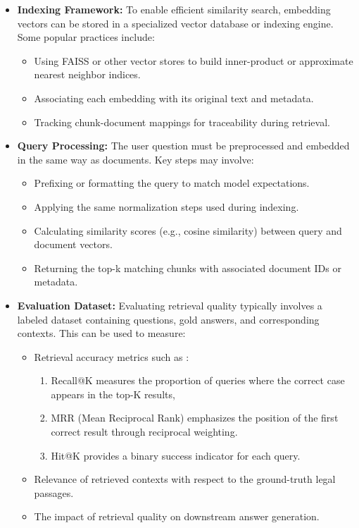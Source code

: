 \begin{itemize}
	\item \textbf{Indexing Framework:}
	To enable efficient similarity search, embedding vectors can be stored in a specialized vector database or indexing engine. Some popular practices include:
	\begin{itemize}
		\item Using FAISS or other vector stores to build inner-product or approximate nearest neighbor indices.
		\item Associating each embedding with its original text and metadata.
		\item Tracking chunk-document mappings for traceability during retrieval.
	\end{itemize}
	
	\item \textbf{Query Processing:}
	The user question must be preprocessed and embedded in the same way as documents. Key steps may involve:
	\begin{itemize}
		\item Prefixing or formatting the query to match model expectations.
		\item Applying the same normalization steps used during indexing.
		\item Calculating similarity scores (e.g., cosine similarity) between query and document vectors.
		\item Returning the top-k matching chunks with associated document IDs or metadata.
	\end{itemize}
	
	\item \textbf{Evaluation Dataset:}
	Evaluating retrieval quality typically involves a labeled dataset containing questions, gold answers, and corresponding contexts. This can be used to measure:
	\begin{itemize}
		\item Retrieval accuracy metrics such as :
		\begin{enumerate}
			\item  Recall@K measures the proportion of queries where the correct case appears in the top-K results,
			\item  MRR (Mean Reciprocal Rank) emphasizes the position of the first correct result through reciprocal weighting. 
			\item Hit@K provides a binary success indicator for each query. 
		\end{enumerate}
		\item Relevance of retrieved contexts with respect to the ground-truth legal passages.
		\item The impact of retrieval quality on downstream answer generation.
	\end{itemize}
\end{itemize}
